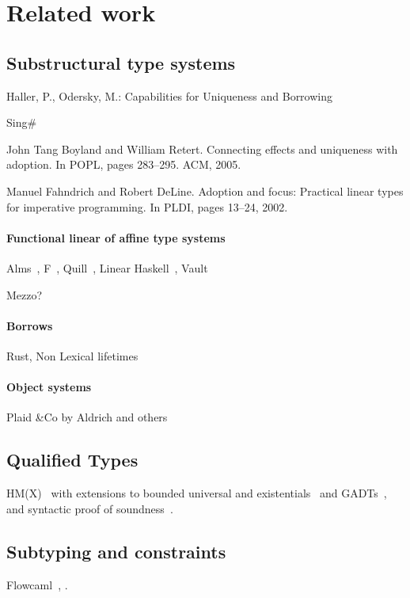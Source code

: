 \section{Related work}

\subsection{Substructural type systems}

Haller, P., Odersky, M.: Capabilities for Uniqueness and Borrowing
\cite{DBLP:conf/ecoop/HallerO10}

Sing\#

John Tang Boyland and William Retert. Connecting effects and
uniqueness with adoption. In POPL, pages 283–295. ACM, 2005.
\cite{DBLP:conf/popl/BoylandR05}

Manuel Fahndrich and Robert DeLine. Adoption and focus: Practical
linear types for imperative programming. In PLDI, pages 13–24, 2002.

\paragraph{Functional linear of affine type systems}

Alms~\citep{DBLP:conf/popl/TovP11},
F\degree~\citep{DBLP:conf/tldi/MazurakZZ10},
Quill~\citep{DBLP:conf/icfp/Morris16},
Linear Haskell~\citep{DBLP:journals/pacmpl/BernardyBNJS18},
Vault\citep{DBLP:conf/pldi/DeLineF01,DBLP:conf/pldi/FahndrichD02}

Mezzo?

\paragraph{Borrows}

Rust, Non Lexical lifetimes

\paragraph{Object systems}
\TODO{}

Plaid \&Co by Aldrich and others

\subsection{Qualified Types}

HM(X)~\citep{DBLP:journals/tapos/OderskySW99} with extensions to
bounded universal and existentials~\citep{DBLP:conf/icfp/Simonet03}
and GADTs~\citep{DBLP:journals/toplas/SimonetP07},
and syntactic proof of soundness~\citep{DBLP:journals/entcs/SkalkaP02}.

\subsection{Subtyping and constraints}

Flowcaml~\citep{DBLP:conf/popl/PottierS02},
\citet{DBLP:conf/sas/TrifonovS96}.


